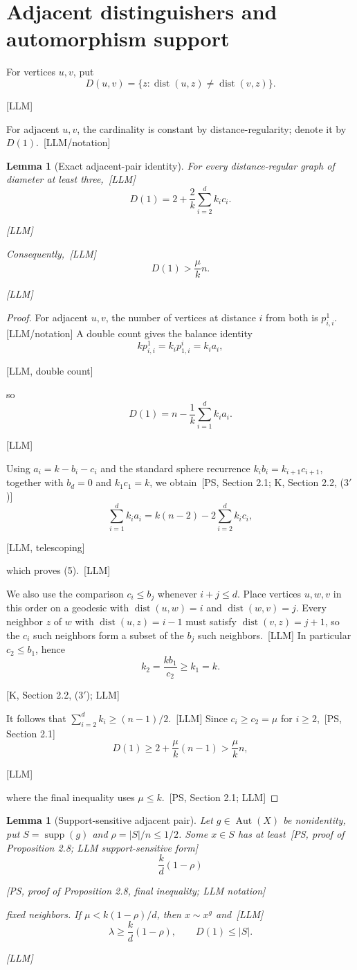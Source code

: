 \documentclass[10pt]{amsart}
\newtheorem{lemma}[theorem]{Lemma}
\theoremstyle{remark}
\DeclareMathOperator{\Aut}{Aut}
\DeclareMathOperator{\supp}{supp}
\DeclareMathOperator{\dist}{dist}
\newcommand{\prov}[1]{\unskip\, {\normalfont\scriptsize\color{provgray}\textsf{[#1]}}}
\newcommand{\eqprov}[1]{%
  \par\nobreak\vspace{-0.68\baselineskip}%
  \noindent\hfill{\normalfont\scriptsize\color{provgray}\textsf{[#1]}}%
  \par\vspace{0.20\baselineskip}%
}
\begin{document}
\section{Adjacent distinguishers and automorphism support}
For vertices $u,v$, put
\[
D(u,v)=\{z:\dist(u,z)\ne\dist(v,z)\}.
\]
\eqprov{LLM}
For adjacent $u,v$, the cardinality is constant by distance-regularity; denote it by $D(1)$.\prov{LLM/notation}

\begin{lemma}[Exact adjacent-pair identity]\label{lem:adjacent-identity}
For every distance-regular graph of diameter at least three,\prov{LLM}
\begin{equation}
D(1)=2+\frac{2}{k}\sum_{i=2}^{d}k_i c_i.
\end{equation}
\eqprov{LLM}
Consequently,\prov{LLM}
\begin{equation}
D(1)>\frac{\mu}{k}n.
\end{equation}
\eqprov{LLM}
\end{lemma}

\begin{proof}
For adjacent $u,v$, the number of vertices at distance $i$ from both is $p^1_{i,i}$.\prov{LLM/notation} A double count gives the balance identity
\[
kp^1_{i,i}=k_i p^i_{1,i}=k_i a_i,
\]
\eqprov{LLM, double count}
so
\[
D(1)=n-\frac1k\sum_{i=1}^{d}k_i a_i.
\]
\eqprov{LLM}
Using $a_i=k-b_i-c_i$ and the standard sphere recurrence $k_i b_i=k_{i+1}c_{i+1}$, together with $b_d=0$ and $k_1c_1=k$, we obtain\prov{PS, Section 2.1; K, Section 2.2, (3\(\prime\))}
\[
\sum_{i=1}^{d}k_i a_i=k(n-2)-2\sum_{i=2}^{d}k_i c_i,
\]
\eqprov{LLM, telescoping}
which proves (5).\prov{LLM}

We also use the comparison $c_i\le b_j$ whenever $i+j\le d$. Place vertices $u,w,v$ in this order on a geodesic with $\dist(u,w)=i$ and $\dist(w,v)=j$. Every neighbor $z$ of $w$ with $\dist(u,z)=i-1$ must satisfy $\dist(v,z)=j+1$, so the $c_i$ such neighbors form a subset of the $b_j$ such neighbors.\prov{LLM} In particular $c_2\le b_1$, hence
\[
k_2=\frac{kb_1}{c_2}\ge k_1=k.
\]
\eqprov{K, Section 2.2, (3\(\prime\)); LLM}
It follows that $\sum_{i=2}^{d}k_i\ge(n-1)/2$.\prov{LLM} Since $c_i\ge c_2=\mu$ for $i\ge2$,\prov{PS, Section 2.1}
\[
D(1)\ge2+\frac{\mu}{k}(n-1)>\frac{\mu}{k}n,
\]
\eqprov{LLM}
where the final inequality uses $\mu\le k$.\prov{PS, Section 2.1; LLM}
\end{proof}

\begin{lemma}[Support-sensitive adjacent pair]\label{lem:support-adjacent}
Let $g\in\Aut(X)$ be nonidentity, put $S=\supp(g)$ and $\rho=|S|/n\le1/2$. Some $x\in S$ has at least\prov{PS, proof of Proposition 2.8; LLM support-sensitive form}
\begin{equation}
\frac{k}{d}(1-\rho)
\end{equation}
\eqprov{PS, proof of Proposition 2.8, final inequality; LLM notation}
fixed neighbors. If $\mu<k(1-\rho)/d$, then $x\sim x^g$ and\prov{LLM}
\begin{equation}
\lambda\ge\frac{k}{d}(1-\rho),\qquad D(1)\le|S|.
\end{equation}
\eqprov{LLM}
\end{lemma}
\end{document}
